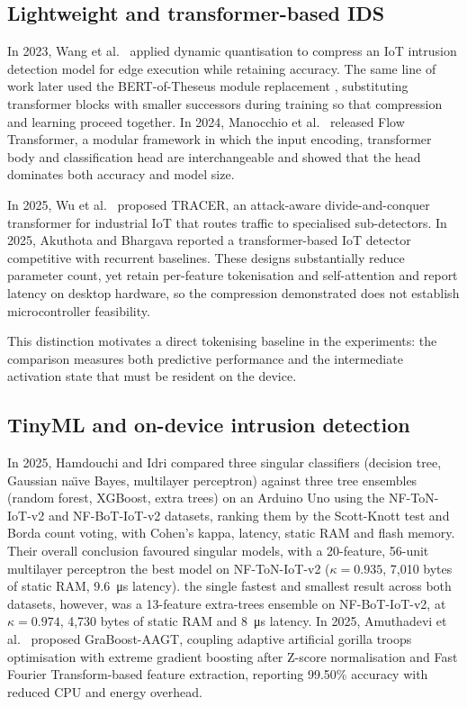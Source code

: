 \documentclass[10pt,letterpaper,twocolumn]{article}
\begin{document}
\subsection{Lightweight and transformer-based IDS}
\label{sec:related:lightweight}

In 2023, Wang et al.\ \cite{wang2023dynquant} applied dynamic quantisation to
compress an IoT intrusion detection model for edge execution while retaining
accuracy. The same line of work later used the BERT-of-Theseus module
replacement \cite{wang2024theseus}, substituting transformer blocks with
smaller successors during training so that compression and learning proceed
together. In 2024, Manocchio et al.\ \cite{manocchio2024flowtransformer}
released Flow Transformer, a modular framework in which the input encoding,
transformer body and classification head are interchangeable and showed that
the head dominates both accuracy and model size.

In 2025, Wu et al.\ \cite{wu2025tracer} proposed TRACER, an attack-aware
divide-and-conquer transformer for industrial IoT that routes traffic to
specialised sub-detectors. In 2025, Akuthota and Bhargava
\cite{akuthota2025transformer} reported a transformer-based IoT detector
competitive with recurrent baselines. These designs substantially reduce
parameter count, yet retain per-feature tokenisation and self-attention and
report latency on desktop hardware, so the compression demonstrated does not
establish microcontroller feasibility.

This distinction motivates a direct tokenising baseline in the experiments:
the comparison measures both predictive performance and the intermediate
activation state that must be resident on the device.

\subsection{TinyML and on-device intrusion detection}
\label{sec:related:tinyml}

In 2025, Hamdouchi and Idri \cite{hamdouchi2025tinyml} compared three singular
classifiers (decision tree, Gaussian na\"{\i}ve Bayes, multilayer perceptron)
against three tree ensembles (random forest, XGBoost, extra trees) on an
Arduino Uno using the NF-ToN-IoT-v2 and NF-BoT-IoT-v2 datasets, ranking them by
the Scott-Knott test and Borda count voting, with Cohen's kappa, latency,
static RAM and flash memory. Their overall conclusion favoured singular
models, with a 20-feature, 56-unit multilayer perceptron the best model on
NF-ToN-IoT-v2 ($\kappa = 0.935$, 7,010 bytes of static RAM,
\SI{9.6}{\micro\second} latency). the single fastest and smallest result
across both datasets, however, was a 13-feature extra-trees ensemble on
NF-BoT-IoT-v2, at $\kappa = 0.974$, 4,730 bytes of static RAM and
\SI{8}{\micro\second} latency. In 2025, Amuthadevi et al.\
\cite{amuthadevi2025graboost} proposed GraBoost-AAGT, coupling adaptive
artificial gorilla troops optimisation with extreme gradient boosting after
Z-score normalisation and Fast Fourier Transform-based feature extraction,
reporting 99.50\% accuracy with reduced CPU and energy overhead.
\end{document}
